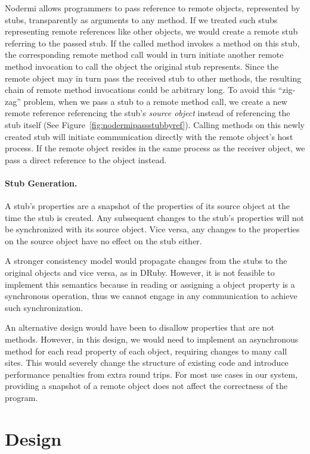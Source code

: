Nodermi allows programmers to pass reference to remote objects,
represented by stubs, transparently as arguments to any method.
If we treated such stubs representing remote references like other
objects, we would create a remote stub referring to the passed stub.
If the called method invokes a method on this stub,
the corresponding remote method call would in turn initiate another
remote method invocation to call the object the original stub represents.
Since the remote object may in turn pass the received stub to other
methods, the resulting chain of remote method invocations could
be arbitrary long.
To avoid this ``zig-zag'' problem, when we pass a stub to a remote method call,
we create a new remote reference referencing
 the stub's \emph{source object} instead of referencing the stub itself
 (See Figure~\ref{fig:nodermipassstubbyref}).
Calling methods on this newly created stub will initiate
communication directly with the remote object's host process.
If the remote object resides in the same process as the
receiver object, we pass a direct reference to the object
instead.

\paragraph{Stub Generation.}
A stub's properties are a snapshot of the properties
of its source object at the time the stub is created.
Any subsequent changes to the stub's properties will not
be synchronized with its source object.
Vice versa, any changes to the properties on the source object
have no effect on the stub either.

A stronger consistency  model would propagate changes from
the stubs to the original objects and vice versa, as in DRuby\cite{druby}.
However, it is not feasible to implement this semantics because
in \js{} reading or assigning a object property is a synchronous
operation, thus we cannot engage in any communication to achieve
such synchronization.

An alternative design would have been to disallow properties that
are not methods.
However, in this design, we would need to implement an asynchronous method
for each read property of each object, requiring changes to many
call sites.
This would severely change the structure of existing code
and introduce performance penalties from extra round trips.
For most use cases in our system, providing a snapshot of a
remote object does not affect the correctness of the program.


\section{Design}

